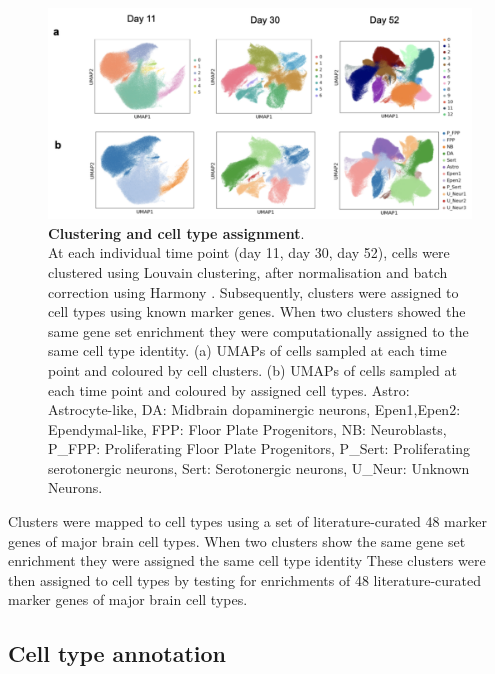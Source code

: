 \begin{figure}[h]
\centering
\includegraphics[width=16cm]{Chapter5/Fig/neuroseq_clusters_celltypes.png}
\caption[Clustering and cell type assignment]{\textbf{Clustering and cell type assignment}.\\
At each individual time point (day 11, day 30, day 52), cells were clustered using Louvain clustering, after normalisation and batch correction using Harmony \cite{korsunsky2019fast}.
Subsequently, clusters were assigned to cell types using known marker genes. 
When two clusters showed the same gene set enrichment they were computationally assigned to the same cell type identity. 
(a) UMAPs of cells sampled at each time point and coloured by cell clusters. 
(b) UMAPs of cells sampled at each time point and coloured by assigned cell types.
Astro: Astrocyte-like, DA: Midbrain dopaminergic neurons, Epen1,Epen2: Ependymal-like, FPP: Floor Plate Progenitors, NB: Neuroblasts, P\_FPP: Proliferating Floor Plate Progenitors, P\_Sert: Proliferating serotonergic neurons, Sert: Serotonergic neurons, U\_Neur: Unknown Neurons.}
\label{fig:neuroseq_clusters}
\end{figure}

Clusters were mapped to cell types using a set of literature-curated 48 marker genes of major brain cell types. 
When two clusters show the same gene set enrichment they were assigned the same cell type identity
These clusters were then assigned to cell types by testing for enrichments of 48 literature-curated marker genes of major brain cell types.\\

\subsection{Cell type annotation}


